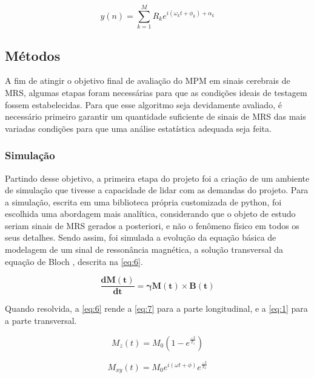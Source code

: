 \documentclass{article}
\begin{document}
\begin{equation} \label{eq:11}
    y(n) = \sum_{k=1}^{M} R_k e^{i (\omega_k t + \phi_k) + \alpha_k }
\end{equation}

\subsection{Métodos}

A fim de atingir o objetivo final de avaliação do MPM em sinais cerebrais de MRS, algumas etapas foram 
necessárias para que as condições ideais de testagem fossem estabelecidas. Para que esse algoritmo 
seja devidamente avaliado, é necessário primeiro garantir um quantidade suficiente de sinais de 
MRS das mais variadas condições para que uma análise estatística adequada seja feita. 

\subsubsection{Simulação}

Partindo desse objetivo, a primeira etapa do projeto foi a criação de um ambiente de simulação
que tivesse a capacidade de lidar com as demandas do projeto. Para a simulação, escrita em uma biblioteca 
própria customizada de python, foi escolhida uma abordagem mais analítica, considerando que o objeto de estudo seriam
sinais de MRS gerados a posteriori, e não o fenômeno físico em todos os seus detalhes. Sendo assim, foi simulada a evolução 
da equação básica de modelagem de um sinal de ressonância magnética, a solução transversal da equação de Bloch \cite{PhysRev.70.460}, 
descrita na \autoref{eq:6}.

\begin{equation} \label{eq:6}
    \mathbf{\frac{dM(t)}{dt}} = \mathbf{\gamma M(t)} \times \mathbf{B(t)}
\end{equation}

Quando resolvida, a \autoref{eq:6} rende a \autoref{eq:7} para a parte longitudinal, e a \autoref{eq:1} para a parte transversal.

\begin{equation} \label{eq:7}
    M_z(t) = M_0 (1 - e^{\frac{-t}{T_1}})
\end{equation}

\begin{equation} \label{eq:1}
    M_{xy}(t) = M_0 e^{i(\omega t + \phi)} e^{\frac{-t}{T_2}}
\end{equation}
\end{document}
